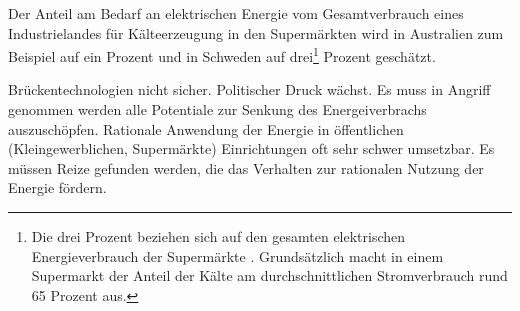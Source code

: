Der Anteil am Bedarf an elektrischen Energie vom Gesamtverbrauch eines Industrielandes für Kälteerzeugung in den Supermärkten
wird in Australien zum Beispiel auf ein Prozent \cite[Seite 8]{australia} und in Schweden auf drei\footnote{ Die drei Prozent
beziehen sich auf den gesamten elektrischen Energieverbrauch der Supermärkte \cite[Seite 6]{doctor}. Grundsätzlich macht in
einem Supermarkt der Anteil der Kälte am durchschnittlichen Stromverbrauch rund 65 Prozent aus.\cite{EANRW}} Prozent
geschätzt.

Brückentechnologien nicht sicher. Politischer Druck wächst. Es muss in Angriff genommen werden alle Potentiale zur Senkung
des Energeiverbrachs auszuschöpfen.  Rationale Anwendung der Energie in öffentlichen (Kleingewerblichen, Supermärkte)
Einrichtungen oft sehr schwer umsetzbar. Es müssen Reize gefunden werden, die das Verhalten zur rationalen Nutzung der
Energie fördern.

